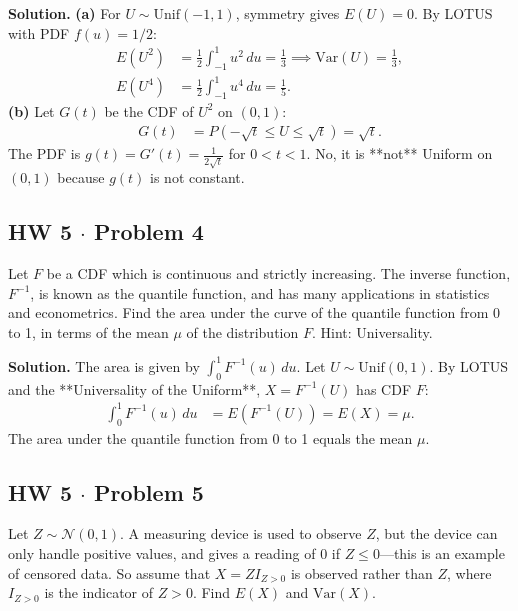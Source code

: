 \documentclass[11pt,a4paper]{article}
\begin{document}
\noindent \textbf{Solution.} \textbf{(a)} For $U \sim \text{Unif}(-1, 1)$, symmetry gives $E(U) = 0$. By LOTUS with PDF $f(u) = 1/2$:
\begin{align*}
E(U^2) &= \frac{1}{2} \int_{-1}^{1} u^2 \, du = \frac{1}{3} \implies \text{Var}(U) = \frac{1}{3}, \\
E(U^4) &= \frac{1}{2} \int_{-1}^{1} u^4 \, du = \frac{1}{5}.
\end{align*}
\textbf{(b)} Let $G(t)$ be the CDF of $U^2$ on $(0, 1)$:
\begin{align*}
G(t) &= P(-\sqrt{t} \le U \le \sqrt{t}) = \sqrt{t}.
\end{align*}
The PDF is $g(t) = G'(t) = \frac{1}{2\sqrt{t}}$ for $0 < t < 1$. No, it is **not** Uniform on $(0, 1)$ because $g(t)$ is not constant.

\vspace{10pt}
\subsection{HW 5 $\cdot$ Problem 4}
\begin{tcolorbox}[title={HW 5 $\cdot$ Problem 4}]
Let $F$ be a CDF which is continuous and strictly increasing. The inverse function, $F^{-1}$, is known as the quantile function, and has many applications in statistics and econometrics. Find the area under the curve of the quantile function from 0 to 1, in terms of the mean $\mu$ of the distribution $F$. Hint: Universality.
\end{tcolorbox}

\noindent \textbf{Solution.} The area is given by $\int_{0}^{1} F^{-1}(u) \, du$. Let $U \sim \text{Unif}(0, 1)$. By LOTUS and the **Universality of the Uniform**, $X = F^{-1}(U)$ has CDF $F$:
\begin{align*}
\int_{0}^{1} F^{-1}(u) \, du &= E\left( F^{-1}(U) \right) = E(X) = \mu.
\end{align*}
The area under the quantile function from 0 to 1 equals the mean $\mu$.

\vspace{10pt}
\subsection{HW 5 $\cdot$ Problem 5}
\begin{tcolorbox}[title={HW 5 $\cdot$ Problem 5}]
Let $Z \sim \mathcal{N}(0, 1)$. A measuring device is used to observe $Z$, but the device can only handle positive values, and gives a reading of 0 if $Z \le 0$---this is an example of censored data. So assume that $X = Z I_{Z > 0}$ is observed rather than $Z$, where $I_{Z > 0}$ is the indicator of $Z > 0$. Find $E(X)$ and $\text{Var}(X)$.
\end{tcolorbox}
\end{document}
